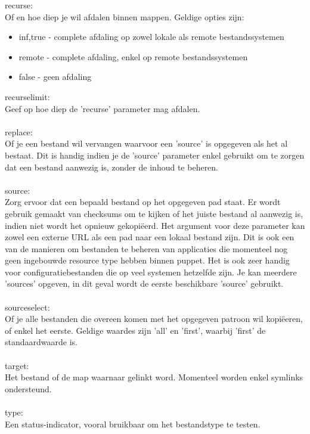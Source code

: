 %
recurse:\\
Of en hoe diep je wil afdalen binnen mappen. Geldige opties zijn:
\begin{itemize}
\item inf,true - complete afdaling op zowel lokale als remote bestandssystemen
\item remote - complete afdaling, enkel op remote bestandssystemen
\item false - geen afdaling
\end{itemize}
%
recurselimit:\\
Geef op hoe diep de 'recurse' parameter mag afdalen.\\\\
%
replace:\\
Of je een bestand wil vervangen waarvoor een 'source' is opgegeven als het al bestaat. Dit is handig indien je de 'source' parameter enkel gebruikt om te zorgen dat een bestand aanwezig is, zonder de inhoud te beheren.\\\\
%
source:\\
Zorg ervoor dat een bepaald bestand op het opgegeven pad staat. Er wordt gebruik gemaakt van checksums om te kijken of het juiste bestand al aanwezig is, indien niet wordt het opnieuw gekopi\"eerd. Het argument voor deze parameter kan zowel een externe URL als een pad naar een lokaal bestand zijn. Dit is ook een van de manieren om bestanden te beheren van applicaties die momenteel nog geen ingebouwde resource type hebben binnen puppet. Het is ook zeer handig voor configuratiebestanden die op veel systemen hetzelfde zijn. Je kan meerdere 'sources' opgeven, in dit geval wordt de eerste beschikbare 'source' gebruikt.\\\\
%
sourceselect:\\
Of je alle bestanden die overeen komen met het opgegeven patroon wil kopi\"eeren, of enkel het eerste. Geldige waardes zijn 'all' en 'first', waarbij 'first' de standaardwaarde is.\\\\
%
target:\\
Het bestand of de map waarnaar gelinkt word. Momenteel worden enkel symlinks ondersteund.\\\\
%
type:\\
Een status-indicator, vooral bruikbaar om het bestandstype te testen.\\\\
